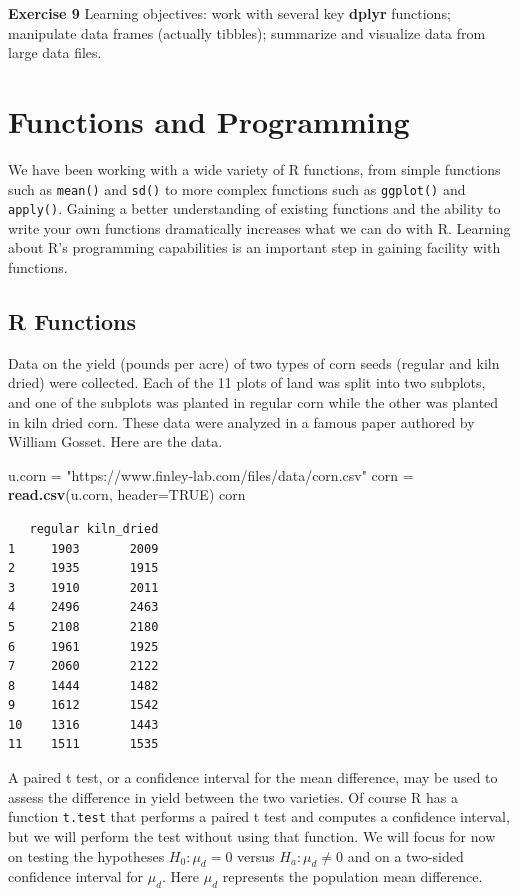 \documentclass[
]{krantz}
\makeatletter
\newenvironment{Shaded}{\begin{snugshade}}{\end{snugshade}}
\newcommand{\DataTypeTok}[1]{\textcolor[rgb]{0.27,0.27,0.27}{#1}}
\newcommand{\KeywordTok}[1]{\textcolor[rgb]{0.27,0.27,0.27}{\textbf{#1}}}
\newcommand{\NormalTok}[1]{#1}
\newcommand{\OtherTok}[1]{\textcolor[rgb]{0.37,0.37,0.37}{#1}}
\newcommand{\StringTok}[1]{\textcolor[rgb]{0.5,0.5,0.5}{#1}}
\newenvironment{kframe}{%
\medskip{}
\setlength{\fboxsep}{.8em}
 \def\at@end@of@kframe{}%
 \ifinner\ifhmode%
  \def\at@end@of@kframe{\end{minipage}}%
  \begin{minipage}{\columnwidth}%
 \fi\fi%
 \def\FrameCommand##1{\hskip\@totalleftmargin \hskip-\fboxsep
 \colorbox{shadecolor}{##1}\hskip-\fboxsep
     \hskip-\linewidth \hskip-\@totalleftmargin \hskip\columnwidth}%
 \MakeFramed {\advance\hsize-\width
   \@totalleftmargin\z@ \linewidth\hsize
   \@setminipage}}%
 {\par\unskip\endMakeFramed%
 \at@end@of@kframe}
\renewenvironment{Shaded}{\begin{kframe}}{\end{kframe}}
\makeatother
\begin{document}
\textbf{Exercise 9} Learning objectives: work with several key \textbf{dplyr} functions; manipulate data frames (actually tibbles); summarize and visualize data from large data files.

\hypertarget{functions}{%
\chapter{Functions and Programming}\label{functions}}

We have been working with a wide variety of R functions, from simple functions such as \texttt{mean()} and \texttt{sd()} to more complex functions such as \texttt{ggplot()} and \texttt{apply()}. Gaining a better understanding of existing functions and the ability to write your own functions dramatically increases what we can do with R. Learning about R's programming capabilities is an important step in gaining facility with functions.

\hypertarget{r-functions}{%
\section{R Functions}\label{r-functions}}

Data on the yield (pounds per acre) of two types of corn seeds (regular and kiln dried) were collected. Each of the 11 plots of land was split into two subplots, and one of the subplots was planted in regular corn while the other was planted in kiln dried corn. These data were analyzed in a famous paper authored by William Gosset. Here are the data.

\begin{Shaded}
\begin{Highlighting}[]
\NormalTok{u.corn =}\StringTok{ "https://www.finley{-}lab.com/files/data/corn.csv"}
\NormalTok{corn =}\StringTok{ }\KeywordTok{read.csv}\NormalTok{(u.corn, }\DataTypeTok{header=}\OtherTok{TRUE}\NormalTok{)}
\NormalTok{corn}
\end{Highlighting}
\end{Shaded}

\begin{verbatim}
   regular kiln_dried
1     1903       2009
2     1935       1915
3     1910       2011
4     2496       2463
5     2108       2180
6     1961       1925
7     2060       2122
8     1444       1482
9     1612       1542
10    1316       1443
11    1511       1535
\end{verbatim}

A paired t test, or a confidence interval for the mean difference, may be used to assess the difference in yield between the two varieties. Of course R has a function \texttt{t.test} that performs a paired t test and computes a confidence interval, but we will perform the test without using that function. We will focus for now on testing the hypotheses \(H_0\colon \mu_d = 0\) versus \(H_a\colon \mu_d \neq 0\) and on a two-sided confidence interval for \(\mu_d\). Here \(\mu_d\) represents the population mean difference.
\end{document}
